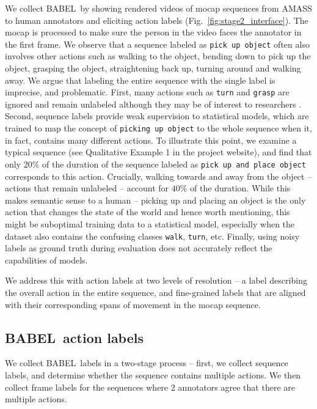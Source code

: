 \documentclass[final]{cvpr}
\def\babel{BABEL}
\begin{document}
We collect \babel~by showing rendered videos of mocap sequences from AMASS \cite{DBLP:conf/iccv/MahmoodGTPB19} to human annotators and eliciting action labels (Fig.~\ref{fig:stage2_interface}). 
The mocap is processed to make sure the person in the video faces the annotator in the first frame. We observe that a sequence labeled as \texttt{pick up object} often also involves other actions such as walking to the object, bending down to pick up the object, grasping the object, straightening back up, turning around and walking away. 
We argue that labeling the entire sequence with the single label is imprecise, and problematic. 
First, many actions such as \texttt{turn} and \texttt{grasp} are ignored and remain unlabeled although they may be of interest to researchers \cite{DBLP:conf/eccv/TaheriGBT20}. 
Second, sequence labels provide weak supervision to statistical models, which are trained to map the concept of \texttt{picking up object} to the whole sequence when it, in fact, contains many different actions. 
To illustrate this point, we examine a typical sequence (see Qualitative Example 1 in the project website), and find that only $20\%$ of the duration of the sequence labeled as \texttt{pick up and place object} corresponds to this action. Crucially, walking towards and away from the object -- actions that remain unlabeled -- account for $40\%$ of the duration. 
While this makes semantic sense to a human -- picking up and placing an object is the only action that changes the state of the world and hence worth mentioning, this might be suboptimal training data to a statistical model, especially when the dataset also contains the confusing classes \texttt{walk}, \texttt{turn}, etc. 
Finally, using noisy labels as ground truth during evaluation does not accurately reflect the capabilities of models. 

We address this with action labels at two levels of resolution -- a label describing the overall action in the entire sequence, and fine-grained labels that are aligned with their corresponding spans of movement in the mocap sequence.

\subsection{\babel~action labels}

We collect \babel~labels in a two-stage process -- first, we collect sequence labels, and determine whether the sequence contains multiple actions. 
We then collect frame labels for the sequences where $2$ annotators agree that there are multiple actions. 
\end{document}
